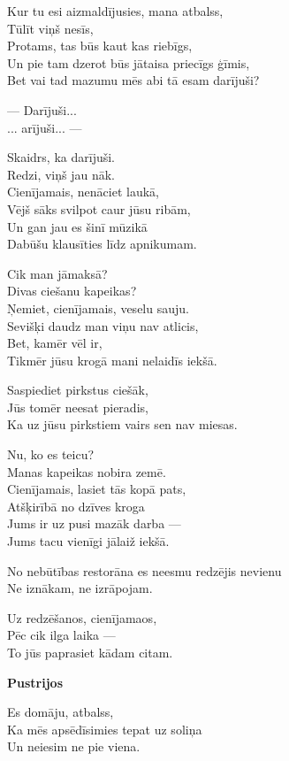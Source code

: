 \documentclass[14pt]{extarticle}
\begin{document}
Kur tu esi aizmaldījusies, mana atbalss,\\
Tūlīt viņš nesīs,\\
Protams, tas būs kaut kas riebīgs,\\
Un pie tam dzerot būs jātaisa priecīgs ģīmis,\\
Bet vai tad mazumu mēs abi tā esam darījuši?

--- Darījuši...\\
... arījuši... ---

Skaidrs, ka darījuši.\\
Redzi, viņš jau nāk.\\
Cienījamais, nenāciet laukā,\\
Vējš sāks svilpot caur jūsu ribām,\\
Un gan jau es šinī mūzikā\\
Dabūšu klausīties līdz apnikumam.

Cik man jāmaksā?\\
Divas ciešanu kapeikas?\\
Ņemiet, cienījamais, veselu sauju.\\
Sevišķi daudz man viņu nav atlicis,\\
Bet, kamēr vēl ir,\\
Tikmēr jūsu krogā mani nelaidīs iekšā.

Saspiediet pirkstus ciešāk,\\
Jūs tomēr neesat pieradis,\\
Ka uz jūsu pirkstiem vairs sen nav miesas.

Nu, ko es teicu?\\
Manas kapeikas nobira zemē.\\
Cienījamais, lasiet tās kopā pats,\\
Atšķirībā no dzīves kroga\\
Jums ir uz pusi mazāk darba ---\\
Jums tacu vienīgi jālaiž iekšā.

No nebūtības restorāna es neesmu redzējis nevienu\\
Ne iznākam, ne izrāpojam.

Uz redzēšanos, cienījamaos,\\
Pēc cik ilga laika ---\\
To jūs paprasiet kādam citam.



\newpage

{\bf Pustrijos}

Es domāju, atbalss,\\
Ka mēs apsēdīsimies tepat uz soliņa\\
Un neiesim ne pie viena.
\end{document}
